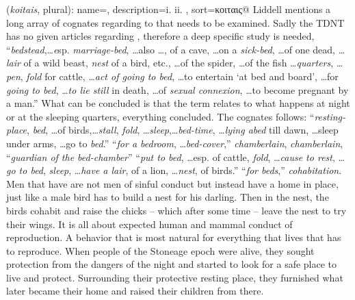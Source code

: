 \item[Nests (multiple),]

(\textit{koitais}, plural):
{
    name=,
    description={i.  ii. },
    sort=κοιταις@
}
Liddell mentions a long array of cognates regarding to  that needs to be examined. Sadly the TDNT has no given articles regarding , therefore a deep specific study is needed,  ``\emph{bedstead},\ldots \emph esp. \emph{marriage-bed}, \ldots also \ldots, of a cave, \ldots on a \emph{sick-bed}, \ldots of one dead, \ldots \emph{lair} of a wild beast, \emph{nest} of a bird, etc., \ldots of the spider, \ldots of the fish \ldots \emph{quarters}, \ldots \emph{pen}, \emph{fold} for cattle, \ldots \emph{act of going to bed}, \ldots to entertain `at bed and board', \ldots for \emph{going to bed}, \ldots \emph{to lie still} in death, \ldots of \emph{sexual connexion}, \ldots to become pregnant by a man.'' What can be concluded is that the term relates to what happens at night or at the sleeping quarters, everything concluded. The cognates follows:  ``\emph{resting-place}, \emph{bed}, \ldots of birds,\ldots \emph{stall}, \emph{fold}, \ldots \emph{sleep},\ldots \emph{bed-time}, \ldots \emph{lying abed} till dawn, \ldots sleep under arms, \ldots go to \emph{bed}.''  ``\emph{for a bedroom}, \ldots \emph{bed-cover},''  \emph{chamberlain},  \emph{chamberlain},  ``\emph{guardian of the bed-chamber}''  ``\emph{put to bed}, \ldots esp. of cattle, \emph{fold}, \ldots \emph{cause to rest}, \ldots \emph{go to bed}, \emph{sleep}, \ldots \emph{have a lair}, of a lion, \ldots \emph{nest}, of birds.''  ``\emph{for beds},''  \emph{cohabitation}.
Men that have  are not men of sinful conduct but instead have a home in place, just like a male bird has to build a nest for his darling. Then in the nest, the birds cohabit and raise the chicks -- which after some time -- leave the nest to try their wings. It is all about expected human and mammal conduct of reproduction. A behavior that is most natural for everything that lives that has to reproduce.
When people of the Stoneage epoch were alive, they sought protection from the dangers of the night and started to look for a safe place to live and protect. Surrounding their protective resting place, they furnished what later became their home and raised their children from there.
